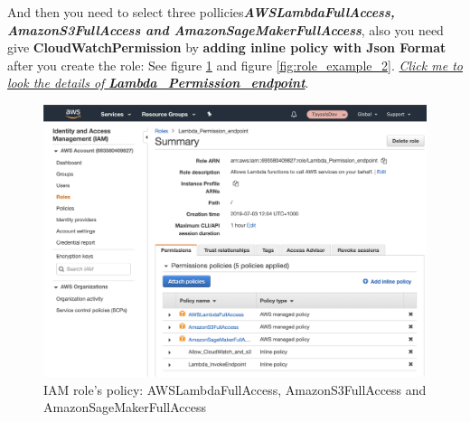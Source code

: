\documentclass[12pt]{article}
\begin{document}
\noindent
And then you need to select three pollicies\textit{\textbf{AWSLambdaFullAccess, AmazonS3FullAccess and AmazonSageMakerFullAccess}}, also you need give \textbf{CloudWatchPermission} by \textbf{adding inline policy with Json Format} after you create the role: 
See figure \ref{fig:Role_example} and figure \ref{fig:role_example_2}. \href{https://console.aws.amazon.com/iam/home?region=ap-southeast-2#/roles/Lambda_Permission_endpoint}{\textit{Click me to look the details of }\textbf{\textit{Lambda\_Permission\_endpoint}}}.

\begin{figure}[H]
\centering
\begin{minipage}{1\textwidth}
  \centering
  \includegraphics[width=1\linewidth]{Role_example.png}
   \caption{IAM role's policy: AWSLambdaFullAccess, AmazonS3FullAccess and AmazonSageMakerFullAccess}
   \label{fig:Role_example}
\end{minipage}%
\end{figure}
\end{document}
